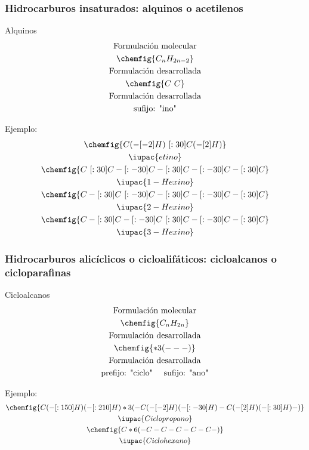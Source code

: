 \subsubsection*{Hidrocarburos insaturados: alquinos o acetilenos}
\begin{Theorem*} {Alquinos}
	\begin{gather*}
		\text{Formulación molecular} \\
		\chemfig{C_nH_{2n-2}} \\
		\text{Formulación desarrollada} \\
		\chemfig{C~C} \\
		\text{Formulación desarrollada} \\
		\text{sufijo: "ino"}
	\end{gather*}
\end{Theorem*}
\noindent Ejemplo: \\
\begin{gather*}
	\chemfig{C(-[-2]H)~[:30]C(-[2]H)} \\
	\iupac{etino} \\
	\chemfig{C~[:30]C-[:-30]C-[:30]C-[:-30]C-[:30]C}\\
	\iupac{1-Hexino} \\
	\chemfig{C-[:30]C~[:-30]C-[:30]C-[:-30]C-[:30]C} \\
	\iupac{2-Hexino} \\
	\chemfig{C-[:30]C-[:-30]C~[:30]C-[:-30]C-[:30]C} \\
	\iupac{3-Hexino}
\end{gather*}
\subsubsection*{Hidrocarburos alicíclicos o cicloalifáticos: cicloalcanos o cicloparafinas}
\begin{Theorem*} {Cicloalcanos}
	\begin{gather*}
		\text{Formulación molecular} \\
		\chemfig{C_nH_{2n}} \\
		\text{Formulación desarrollada} \\
		\chemfig{*3(---)} \\
		\text{Formulación desarrollada} \\
		\text{prefijo: "ciclo" \quad sufijo: "ano"}
	\end{gather*}
\end{Theorem*}
\noindent Ejemplo: \\
\begin{gather*}
	\chemfig{C(-[:150]H)(-[:210]H)*3(-C(-[-2]H)(-[:-30]H)-C(-[2]H)(-[:30]H)-)} \\
	\iupac{Ciclopropano} \\
	\chemfig{C*6(-C-C-C-C-C-)}\\
	\iupac{Ciclohexano} \\
\end{gather*}
